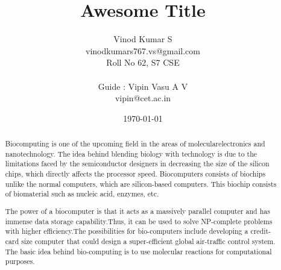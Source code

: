 \documentclass[a4paper,10pt]{article}
\title{\Huge {\textbf {Awesome Title}}}
\author{
  \Large { Vinod Kumar S } \\
  vinodkumars767.vs@gmail.com \\
  \small Roll No 62, S7 CSE \\
  \\
  \Large {Guide : Vipin Vasu A V}\\
  vipin@cet.ac.in
}
\date{\today}
\begin{document}
\maketitle
\nocite{*}

\renewcommand{\abstractname}{\Large Abstract}
\begin{abstract}
Biocomputing is one of the upcoming field in the areas of molecularelectronics and nanotechnology. The idea behind blending biology with technology is due to the limitations faced by the semiconductor designers in decreasing the size of the silicon chips, which directly affects the processor speed. Biocomputers consists of biochips unlike the normal computers, which are silicon-based computers. This biochip consists of biomaterial such as nucleic acid, enzymes, etc.

The power of a biocomputer is that it acts as a massively parallel computer and has immense data storage capability.Thus, it can be used to solve NP-complete problems with higher efficiency.The possibilities for bio-computers include developing a credit-card size computer that could design a super-efficient global air-traffic control system. The basic idea behind bio-computing is to use molecular reactions for computational purposes.
\end{abstract}

{}

\end{document}
